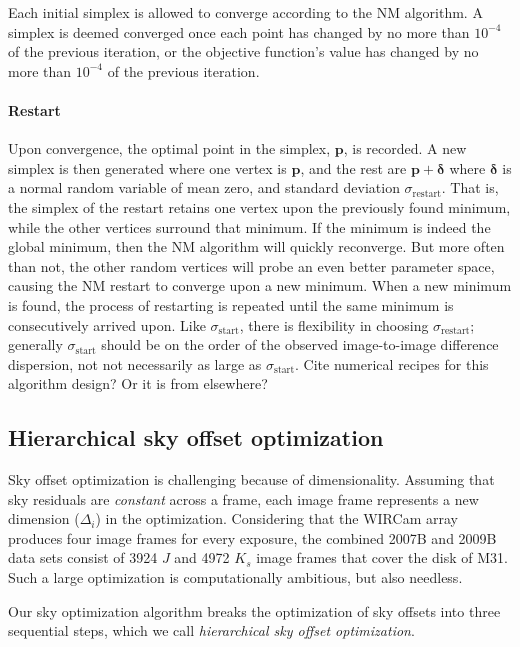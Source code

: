 \documentclass[iop]{emulateapj}
\newcommand{\vect}[1]{\boldsymbol{#1}} %
\newcommand{\todo}[1]{\textcolor{BurntOrange}{\textsf{#1}}} %
\begin{document}
Each initial simplex is allowed to converge according to the NM algorithm.
A simplex is deemed converged once each point has changed by no more than $10^{-4}$ of the previous iteration, or the objective function's value has changed by no more than $10^{-4}$ of the previous iteration. 

\paragraph{Restart} Upon convergence, the optimal point in the simplex, $\vect{p}$, is recorded.
A new simplex is then generated where one vertex is $\vect{p}$, and the rest are $\vect{p}+\vect{\delta}$ where $\vect{\delta}$ is a normal random variable of mean zero, and standard deviation $\sigma_\mathrm{restart}$.
That is, the simplex of the restart retains one vertex upon the previously found minimum, while the other vertices surround that minimum.
If the minimum is indeed the global minimum, then the NM algorithm will quickly reconverge.
But more often than not, the other random vertices will probe an even better parameter space, causing the NM restart to converge upon a new minimum.
When a new minimum is found, the process of restarting is repeated until the same minimum is consecutively arrived upon.
Like $\sigma_\mathrm{start}$, there is flexibility in choosing $\sigma_\mathrm{restart}$; generally $\sigma_\mathrm{start}$ should be on the order of the observed image-to-image difference dispersion, not not necessarily as large as $\sigma_\mathrm{start}$.
\todo{Cite numerical recipes for this algorithm design? Or it is from elsewhere?}

\subsection{Hierarchical sky offset optimization}
\label{sec:hierarchical_algo}

Sky offset optimization is challenging because of dimensionality. Assuming that sky residuals are \emph{constant} across a frame, each image frame represents a new dimension ($\Delta_i$) in the optimization. Considering that the WIRCam array produces four image frames for every exposure, the combined 2007B and 2009B data sets consist of 3924 $J$ and 4972 $K_s$ image frames that cover the disk of M31. Such a large optimization is computationally ambitious, but also needless.

Our sky optimization algorithm breaks the optimization of sky offsets into three sequential steps, which we call \emph{hierarchical sky offset optimization}.
\end{document}
